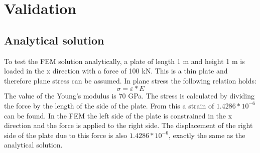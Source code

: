 \chapter{Validation}

\section{Analytical solution}
To test the FEM solution analytically, a plate of length 1 m and height 1 m is loaded in the x direction with a force of 100 kN. This is a thin plate and therefore plane stress can be assumed.
In plane stress the following relation holds:
\[\sigma=\varepsilon*E\]
The value of the Young's modulus is 70 GPa. The stress is calculated by dividing the force by the length of the side of the plate. From this a strain of \(1.4286*10^{-6}\) can be found. 
In the FEM the left side of the plate is constrained in the x direction and the force is applied to the right side. The displacement of the right side of the plate due to this force is also \(1.4286*10^{-6}\), exactly the same as the analytical solution. 
